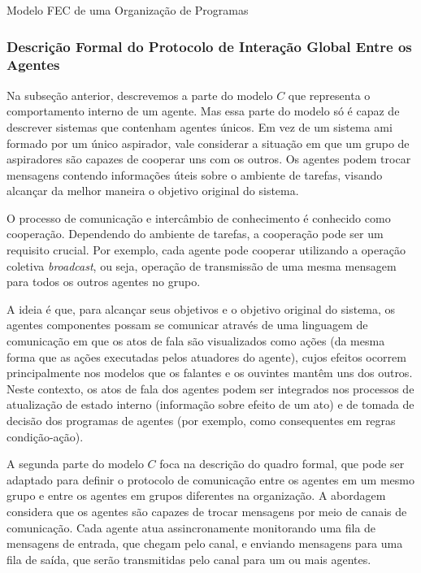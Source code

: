 \begin{section}{Modelo FEC de uma Organização de Programas}
    \subsubsection{Descrição Formal do Protocolo de Interação Global Entre os Agentes}
    
        Na subseção anterior, descrevemos a parte do modelo $C$ que representa o comportamento interno de um agente. Mas essa parte do modelo só é capaz de descrever sistemas que contenham agentes únicos. Em vez de um sistema \acrshort{ami} formado por um único aspirador, vale considerar a situação em que um grupo de aspiradores são capazes de cooperar uns com os outros. Os agentes podem trocar mensagens contendo informações úteis sobre o ambiente de tarefas, visando alcançar da melhor maneira o objetivo original do sistema. 
        
        O processo de comunicação e intercâmbio de conhecimento é conhecido como cooperação. Dependendo do ambiente de tarefas, a cooperação pode ser um requisito crucial. Por exemplo, cada agente pode cooperar utilizando a operação coletiva \textit{broadcast}, ou seja, operação de transmissão de uma mesma mensagem para todos os outros agentes no grupo. 
    
        A ideia é que, para alcançar seus objetivos e o objetivo original do sistema, os agentes componentes possam se comunicar através de uma linguagem de comunicação em que os atos de fala são visualizados como ações (da mesma forma que as ações executadas pelos atuadores do agente), cujos efeitos ocorrem principalmente nos modelos que os falantes e os ouvintes mantêm uns dos outros. Neste contexto, os atos de fala dos agentes podem ser integrados nos processos de atualização de estado interno (informação sobre efeito de um ato) e de tomada de decisão dos programas de agentes (por exemplo, como consequentes em regras condição-ação). 
        
        A segunda parte do modelo $C$ foca na descrição do quadro formal, que pode ser adaptado para definir o protocolo de comunicação entre os agentes em um mesmo grupo e entre os agentes em grupos diferentes na organização. A abordagem considera que os agentes são capazes de trocar mensagens por meio de canais de comunicação. Cada agente atua assincronamente monitorando uma fila de mensagens de entrada, que chegam pelo canal, e enviando mensagens para uma fila de saída, que serão transmitidas pelo canal para um ou mais agentes.
        

\end{section}
